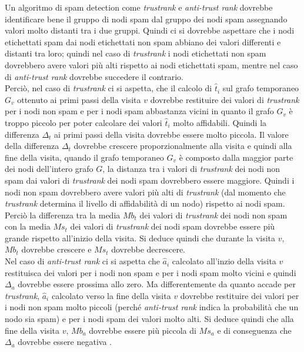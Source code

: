 Un algoritmo di spam detection come \textit{trustrank} e \textit{anti-trust rank} dovrebbe identificare bene il gruppo di nodi spam dal gruppo dei nodi spam assegnando valori molto distanti tra i due gruppi. Quindi ci si dovrebbe aspettare che i nodi etichettati spam dai nodi etichettati non spam abbiano dei valori differenti e distanti tra loro; quindi nel caso di \textit{trustrank} i nodi etichettati non spam dovrebbero avere valori più alti rispetto ai nodi etichettati spam, mentre nel caso di  \textit{anti-trust rank} dovrebbe succedere il contrario.\\
Perciò, nel caso di \textit{trustrank} ci si aspetta, che  il calcolo di \(\hat{t}_i\) sul grafo temporaneo \(G_v\) ottenuto ai primi passi della visita \(v\) dovrebbe restituire dei valori di \textit{trustrank} per i nodi non spam e per i nodi spam abbastanza vicini in quanto il grafo \(G_v\) è troppo piccolo per poter calcolare dei valori \(\hat{t}_i\) molto affidabili. Quindi la differenza \(\Delta_t\) ai primi passi della visita dovrebbe essere molto piccola. Il valore della differenza \(\Delta_t\) dovrebbe crescere proporzionalmente alla visita e quindi alla fine della visita, quando il grafo temporaneo \(G_v\) è composto dalla maggior parte dei nodi dell'intero grafo \(G\), la distanza tra i valori di \textit{trustrank} dei nodi non spam dai valori di \textit{trustrank} dei nodi spam dovrebbero essere maggiore. Quindi i nodi non spam dovrebbero avere valori più alti di \textit{trustrank} (dal momento che \textit{trustrank} determina il livello di affidabilità di un nodo) rispetto ai nodi spam. Perciò 
la 
differenza tra la media \(Mb_t\) dei valori di \textit{trustrank} dei nodi non spam con la media \(Ms_t\) dei valori di \textit{trustrank} dei nodi spam dovrebbe essere più grande rispetto all'inizio della visita. Si deduce quindi che durante la visita \(v\), \(Mb_t\) dovrebbe crescere e \(Ms_t\) dovrebbe decrescere.\\
Nel caso di \textit{anti-trust rank} ci si aspetta  che \(\hat{a}_i\) calcolato all'inzio della visita \(v\) restituisca dei valori per i nodi non spam e per i nodi spam molto vicini e quindi \(\Delta_a\) dovrebbe  essere prossima allo zero. Ma differentemente da quanto accade per \textit{trustrank}, \(\hat{a}_i\) calcolato verso la fine della visita \(v\) dovrebbe restituire dei valori per i nodi non spam molto piccoli (perché \textit{anti-trust rank} indica la probabilità  che un nodo sia spam) e per i nodi spam dei valori molto alti. Si deduce quindi che alla fine della visita \(v\),  \(Mb_a\) dovrebbe essere più piccola di \(Ms_a\) e di conseguenza che \(\Delta_a\) dovrebbe essere negativa . 

